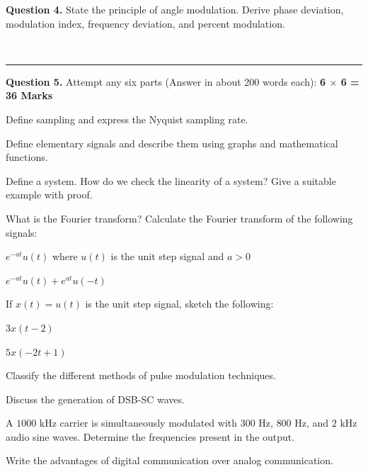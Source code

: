 \documentclass[11pt,a4paper]{article}
\begin{document}
\medskip



\noindent   \textbf{Question 4.} State the principle of angle modulation. Derive phase deviation, modulation index, frequency deviation, and percent modulation.

\bigskip


\\[4pt]
\rule{\linewidth}{0.4pt}\smallskip




\noindent   \textbf{Question 5.} Attempt any six parts (Answer in about 200 words each): \hfill   \textbf{6 $ \times$ 6 = 36 Marks}

\begin{parts}
  \item Define sampling and express the Nyquist sampling rate.
  \item Define elementary signals and describe them using graphs and mathematical functions.
  \item Define a system. How do we check the linearity of a system? Give a suitable example with proof.
  \item What is the Fourier transform? Calculate the Fourier transform of the following signals:
  
\begin{parts}
    \item $e^{-at} u(t)$ where $u(t)$ is the unit step signal and $a > 0$
    \item $e^{-at} u(t) + e^{at} u(-t)$
  \end{parts}
  \item If $x(t) = u(t)$ is the unit step signal, sketch the following:
  
\begin{parts}
    \item $3x(t - 2)$
    \item $5x(-2t + 1)$
  \end{parts}
  \item Classify the different methods of pulse modulation techniques.
  \item Discuss the generation of DSB-SC waves.
  \item A $1000$ kHz carrier is simultaneously modulated with $300$ Hz, $800$ Hz, and $2$ kHz audio sine waves. Determine the frequencies present in the output.
  \item Write the advantages of digital communication over analog communication.
\end{parts}
\end{document}
